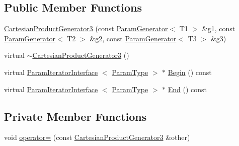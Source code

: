 \subsection*{\-Public \-Member \-Functions}
\begin{DoxyCompactItemize}
\item 
\hyperlink{classtesting_1_1internal_1_1CartesianProductGenerator3_a03a3a063adbad19a1a784130bb672bbb}{\-Cartesian\-Product\-Generator3} (const \hyperlink{classtesting_1_1internal_1_1ParamGenerator}{\-Param\-Generator}$<$ \-T1 $>$ \&g1, const \hyperlink{classtesting_1_1internal_1_1ParamGenerator}{\-Param\-Generator}$<$ \-T2 $>$ \&g2, const \hyperlink{classtesting_1_1internal_1_1ParamGenerator}{\-Param\-Generator}$<$ \-T3 $>$ \&g3)
\item 
virtual \hyperlink{classtesting_1_1internal_1_1CartesianProductGenerator3_afa9a3b0321f5a2169917a46a991e93e1}{$\sim$\-Cartesian\-Product\-Generator3} ()
\item 
virtual \hyperlink{classtesting_1_1internal_1_1ParamIteratorInterface}{\-Param\-Iterator\-Interface}\*
$<$ \hyperlink{classtesting_1_1internal_1_1CartesianProductGenerator3_a61f35be35e7acfed27d8b46ee9713bb3}{\-Param\-Type} $>$ $\ast$ \hyperlink{classtesting_1_1internal_1_1CartesianProductGenerator3_ab6a1e6ee0c9095fec4ca7dd2fe9736cd}{\-Begin} () const 
\item 
virtual \hyperlink{classtesting_1_1internal_1_1ParamIteratorInterface}{\-Param\-Iterator\-Interface}\*
$<$ \hyperlink{classtesting_1_1internal_1_1CartesianProductGenerator3_a61f35be35e7acfed27d8b46ee9713bb3}{\-Param\-Type} $>$ $\ast$ \hyperlink{classtesting_1_1internal_1_1CartesianProductGenerator3_a2175654afa23856e885489861c353c72}{\-End} () const 
\end{DoxyCompactItemize}
\subsection*{\-Private \-Member \-Functions}
\begin{DoxyCompactItemize}
\item 
void \hyperlink{classtesting_1_1internal_1_1CartesianProductGenerator3_a3f7a934cec8573351a196d8cfe0b9719}{operator=} (const \hyperlink{classtesting_1_1internal_1_1CartesianProductGenerator3}{\-Cartesian\-Product\-Generator3} \&other)
\end{DoxyCompactItemize}
